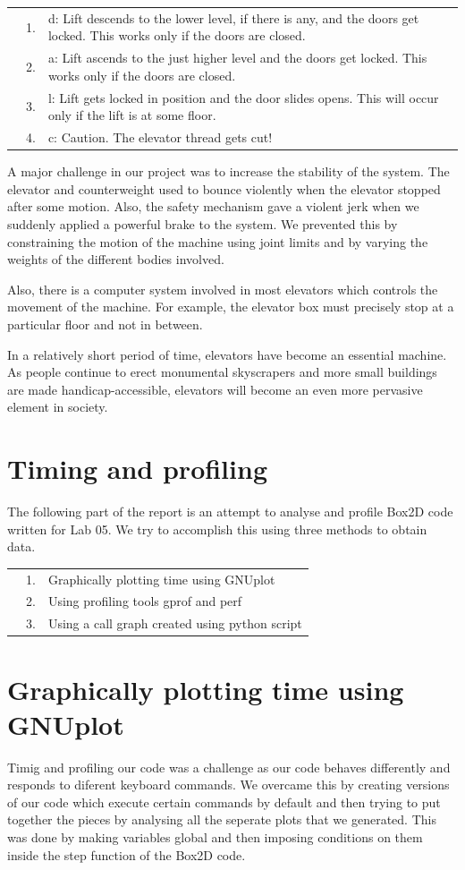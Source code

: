 \documentclass[a4paper,11pt]{article}
\begin{document}
\begin{tabular}{l l l}
& 1. & d: Lift descends to the lower level, if there is any, and the doors get locked. This works only if the doors are closed. \\
& 2. & a: Lift ascends to the just higher level and the doors get locked. This works only if the doors are closed. \\
& 3. & l: Lift gets locked in position and the door slides opens. This will occur only if the lift is at some floor.\\
& 4. & c: Caution. The elevator thread gets cut!\\

\end{tabular}

A major challenge in our project was to increase the stability of the system. The elevator and counterweight used to bounce violently when the elevator stopped after some motion. Also, the safety mechanism gave a violent jerk when we suddenly applied a powerful brake to the system. We prevented this by constraining the motion of the machine using joint limits and by varying the weights of the different bodies involved.

Also, there is a computer system involved in most elevators which controls the movement of the machine. For example, the elevator box must precisely stop at a particular floor and not in between. 

In a relatively short period of time, elevators have become an essential machine. As people continue to erect monumental skyscrapers and more small buildings are made handicap-accessible, elevators will become an even more pervasive element in society. 

\section{Timing and profiling}
The following part of the report is an attempt to analyse and profile Box2D code written for Lab 05. We try to accomplish this using three methods to obtain data.

\begin{tabular}{l l l}
& 1. & Graphically plotting time using GNUplot\\
& 2. & Using profiling tools gprof and perf\\
& 3. & Using a call graph created using python script\\
\end{tabular}

\section{Graphically plotting time using GNUplot}
Timig and profiling our code was a challenge as our code behaves differently and responds to diferent keyboard commands. We overcame this by creating versions of our code which execute certain commands by default and then trying to put together the pieces by analysing all the seperate plots that we generated. This was done by making variables global and then imposing conditions on them inside the step function of the Box2D code. 
\end{document}
